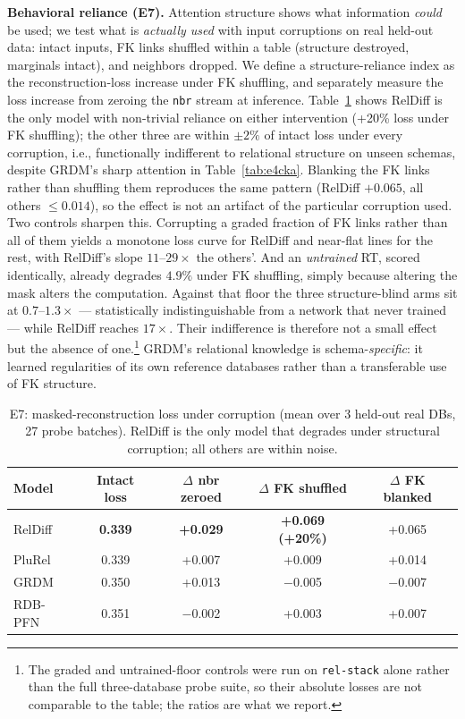 \documentclass{article}
\begin{document}
\textbf{Behavioral reliance (E7).} Attention structure shows what information \emph{could} be used; we test what is \emph{actually used} with input corruptions on real held-out data: intact inputs, FK links shuffled within a table (structure destroyed, marginals intact), and neighbors dropped. We define a structure-reliance index as the reconstruction-loss increase under FK shuffling, and separately measure the loss increase from zeroing the \texttt{nbr} stream at inference. Table~\ref{tab:e7} shows RelDiff is the only model with non-trivial reliance on either intervention (+20\% loss under FK shuffling); the other three are within $\pm2\%$ of intact loss under every corruption, i.e., functionally indifferent to relational structure on unseen schemas, despite GRDM's sharp attention in Table~\ref{tab:e4cka}. Blanking the FK links rather than shuffling them reproduces the same pattern (RelDiff $+0.065$, all others $\leq 0.014$), so the effect is not an artifact of the particular corruption used. Two controls sharpen this. Corrupting a graded fraction of FK links rather than all of them yields a monotone loss curve for RelDiff and near-flat lines for the rest, with RelDiff's slope $11$--$29\times$ the others'. And an \emph{untrained} RT, scored identically, already degrades $4.9\%$ under FK shuffling, simply because altering the mask alters the computation. Against that floor the three structure-blind arms sit at $0.7$--$1.3\times$ --- statistically indistinguishable from a network that never trained --- while RelDiff reaches $17\times$. Their indifference is therefore not a small effect but the absence of one.\footnote{The graded and untrained-floor controls were run on \texttt{rel-stack} alone rather than the full three-database probe suite, so their absolute losses are not comparable to the table; the ratios are what we report.} GRDM's relational knowledge is schema-\emph{specific}: it learned regularities of its own reference databases rather than a transferable use of FK structure.

\begin{table}[t]
\caption{E7: masked-reconstruction loss under corruption (mean over 3 held-out real DBs, 27 probe batches). RelDiff is the only model that degrades under structural corruption; all others are within noise.}
\label{tab:e7}
\centering
\small
\begin{tabular}{lcccc}
\toprule
Model & Intact loss & $\Delta$ nbr zeroed & $\Delta$ FK shuffled & $\Delta$ FK blanked \\
\midrule
RelDiff  & \textbf{0.339} & \textbf{+0.029} & \textbf{+0.069 (+20\%)} & +0.065 \\
PluRel   & 0.339 & +0.007 & +0.009 & +0.014 \\
GRDM     & 0.350 & +0.013 & $-$0.005 & $-$0.007 \\
RDB-PFN  & 0.351 & $-$0.002 & +0.003 & +0.007 \\
\bottomrule
\end{tabular}
\end{table}
\end{document}
